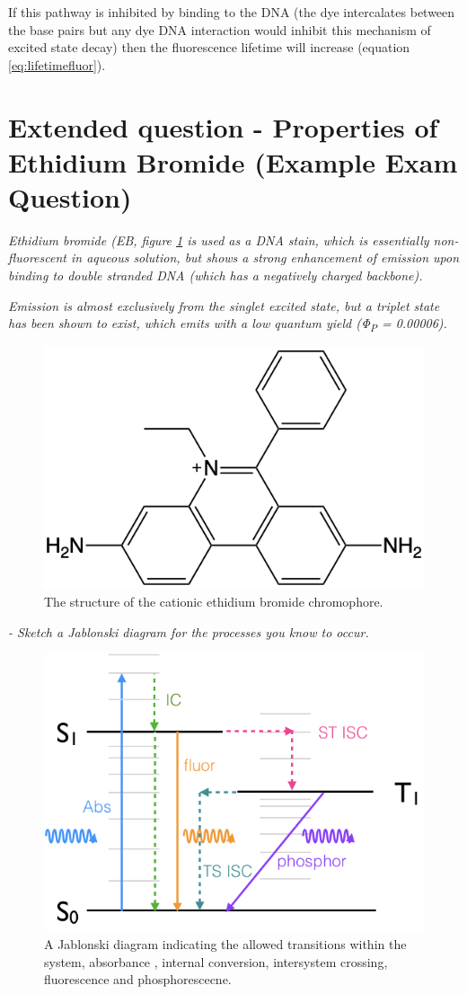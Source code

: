 \documentclass[
]{book}
\begin{document}
If this pathway is inhibited by binding to the DNA (the dye intercalates between the base pairs but any dye DNA interaction would inhibit this mechanism of excited state decay) then the fluorescence lifetime will increase (equation \eqref{eq:lifetimefluor}).

\hypertarget{extended-question---properties-of-ethidium-bromide-example-exam-question}{%
\section{Extended question - Properties of Ethidium Bromide (Example Exam Question)}\label{extended-question---properties-of-ethidium-bromide-example-exam-question}}

\emph{Ethidium bromide (EB, figure \ref{fig:ethidiumstructure} is used as a DNA stain, which is essentially non-fluorescent in aqueous solution, but shows a strong enhancement of emission upon binding to double stranded DNA (which has a negatively charged backbone).}

\emph{Emission is almost exclusively from the singlet excited state, but a triplet state has been shown to exist, which emits with a low quantum yield (Φ\textsubscript{P} = 0.00006).}

\begin{figure}

{\centering \includegraphics[width=0.3\linewidth]{images/ethidiumstructure} 

}

\caption{The structure of the cationic ethidium bromide chromophore.}\label{fig:ethidiumstructure}
\end{figure}

\emph{- Sketch a Jablonski diagram for the processes you know to occur.}

\begin{figure}

{\centering \includegraphics[width=0.6\linewidth]{images/Jablonski} 

}

\caption{A Jablonski diagram indicating the allowed transitions within the system, absorbance , internal conversion, intersystem crossing, fluorescence and phosphorescecne.}\label{fig:Jablonski}
\end{figure}
\end{document}
